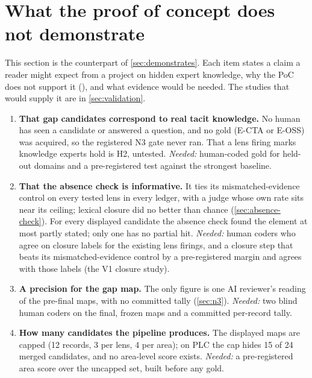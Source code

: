 \section{What the proof of concept does not demonstrate}\label{sec:not-demonstrated}

This section is the counterpart of \cref{sec:demonstrates}. Each item states a claim a reader
might expect from a project on hidden expert knowledge, why the PoC does not support it
(\evobs{}), and what evidence would be needed. The studies that would supply it are in \cref{sec:validation}.

\begin{enumerate}[label=\textbf{D\arabic*}, leftmargin=2.2em, itemsep=3pt]

\item \textbf{That gap candidates correspond to real tacit knowledge.} No human has seen a
  candidate or answered a question, and no gold (E-CTA or E-OSS) was acquired, so the registered N3
  gate never ran. \evhyp{} That a lens firing marks knowledge experts hold is H2, untested.
  \emph{Needed:} human-coded gold for held-out domains and a pre-registered test against the
  strongest baseline.

\item \textbf{That the absence check is informative.} It ties its mismatched-evidence control on every tested lens
  in every ledger, with a judge whose own rate sits near its ceiling; lexical closure did no better
  than chance (\cref{sec:absence-check}). For every displayed candidate the absence check found the
  element at most partly stated; only one has no partial hit. \emph{Needed:} human coders who agree
  on closure labels for the existing lens firings, and a closure step that beats its mismatched-evidence control by
  a pre-registered margin and agrees with those labels (the V1 closure study).

\item \textbf{A precision for the gap map.} The only figure is one AI reviewer's reading of the
  pre-final maps, with no committed tally (\cref{sec:n3}). \emph{Needed:} two blind human coders on
  the final, frozen maps and a committed per-record tally.

\item \textbf{How many candidates the pipeline produces.} The displayed maps are capped (12 records,
  3 per lens, 4 per area); on PLC the cap hides 15 of 24 merged candidates, and no area-level score
  exists. \emph{Needed:} a pre-registered area score over the uncapped set, built before any gold.


\end{enumerate}
